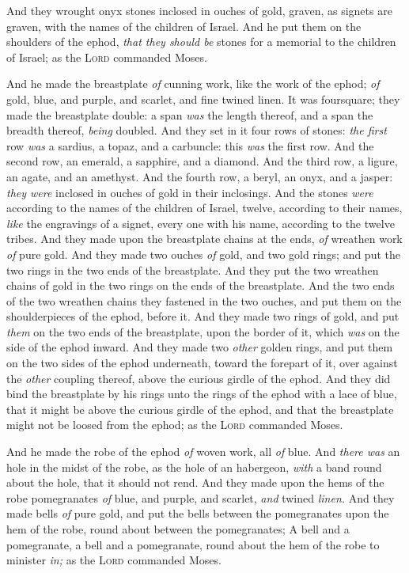 \documentclass[11pt,letterpaper,oneside]{memoir}
\begin{document}
And they wrought onyx stones inclosed in ouches of gold, graven, as
signets are graven, with the names of the children of Israel. And he put
them on the shoulders of the ephod, \emph{that they should be} stones for a
memorial to the children of Israel; as the \textsc{Lord} commanded
Moses.

And he made the breastplate \emph{of} cunning work, like the work of the
ephod; \emph{of} gold, blue, and purple, and scarlet, and fine twined
linen. It was foursquare; they made the breastplate double: a span
\emph{was} the length thereof, and a span the breadth thereof,
\emph{being} doubled. And they set in it four rows of stones: \emph{the
first} row \emph{was} a sardius, a topaz, and a carbuncle: this
\emph{was} the first row. And the second row, an emerald, a sapphire,
and a diamond. And the third row, a ligure, an agate, and an amethyst.
And the fourth row, a beryl, an onyx, and a jasper: \emph{they were}
inclosed in ouches of gold in their inclosings. And the stones
\emph{were} according to the names of the children of Israel, twelve,
according to their names, \emph{like} the engravings of a signet, every
one with his name, according to the twelve tribes. And they made upon
the breastplate chains at the ends, \emph{of} wreathen work \emph{of}
pure gold. And they made two ouches \emph{of} gold, and two gold rings;
and put the two rings in the two ends of the breastplate. And they put
the two wreathen chains of gold in the two rings on the ends of the
breastplate. And the two ends of the two wreathen chains they fastened
in the two ouches, and put them on the shoulderpieces of the ephod,
before it. And they made two rings of gold, and put \emph{them} on the
two ends of the breastplate, upon the border of it, which \emph{was} on
the side of the ephod inward. And they made two \emph{other} golden
rings, and put them on the two sides of the ephod underneath, toward the
forepart of it, over against the \emph{other} coupling thereof, above
the curious girdle of the ephod. And they did bind the breastplate by
his rings unto the rings of the ephod with a lace of blue, that it might
be above the curious girdle of the ephod, and that the breastplate might
not be loosed from the ephod; as the \textsc{Lord} commanded Moses.

And he made the robe of the ephod \emph{of} woven work, all \emph{of}
blue. And \emph{there was} an hole in the midst of the robe, as the hole
of an habergeon, \emph{with} a band round about the hole, that it should
not rend. And they made upon the hems of the robe pomegranates \emph{of}
blue, and purple, and scarlet, \emph{and} twined \emph{linen. }And they made
bells \emph{of} pure gold, and put the bells between the pomegranates
upon the hem of the robe, round about between the pomegranates; A bell
and a pomegranate, a bell and a pomegranate, round about the hem of the
robe to minister \emph{in;} as the \textsc{Lord} commanded Moses.
\end{document}
